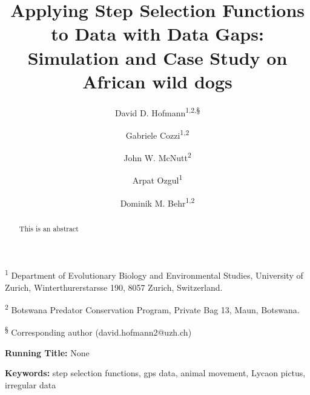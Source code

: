 \documentclass[abstract=on,10pt,a4paper,bibliography=totocnumbered]{article}
\title{Applying Step Selection Functions to Data with Data Gaps: Simulation and
Case Study on African wild dogs}
\author{
  David D. Hofmann\textsuperscript{1,2,\S} \and
  Gabriele Cozzi\textsuperscript{1,2} \and
  John W. McNutt\textsuperscript{2} \and
  Arpat Ozgul\textsuperscript{1} \and
  Dominik M. Behr\textsuperscript{1,2}
}
\begin{document}



\maketitle

\begin{flushleft}

\vspace{0.5cm}

\textsuperscript{1} Department of Evolutionary Biology and Environmental
Studies, University of Zurich, Winterthurerstarsse 190, 8057 Zurich,
Switzerland.

\textsuperscript{2} Botswana Predator Conservation Program, Private Bag 13,
Maun, Botswana.

\textsuperscript{\S} Corresponding author (david.hofmann2@uzh.ch)

\vspace{4cm}

\textbf{Running Title:} None

\vspace{0.5cm}

\textbf{Keywords:} step selection functions, gps data, animal movement, Lycaon
pictus, irregular data

\end{flushleft}

\newpage
\begin{abstract}
This is an abstract
\end{abstract}

\newpage

\onehalfspacing
\tableofcontents
\doublespacing

\newpage
{}

\end{document}
